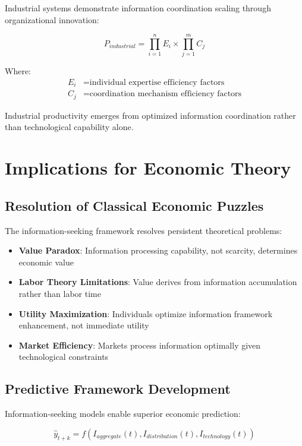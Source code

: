 \documentclass[12pt,a4paper]{article}
\begin{document}
Industrial systems demonstrate information coordination scaling through organizational innovation:

\begin{equation}
P_{industrial} = \prod_{i=1}^{n} E_i \times \prod_{j=1}^{m} C_j
\end{equation}

Where:
\begin{align}
E_i &= \text{individual expertise efficiency factors} \\
C_j &= \text{coordination mechanism efficiency factors}
\end{align}

Industrial productivity emerges from optimized information coordination rather than technological capability alone.

\section{Implications for Economic Theory}

\subsection{Resolution of Classical Economic Puzzles}

The information-seeking framework resolves persistent theoretical problems:

\begin{itemize}
\item \textbf{Value Paradox}: Information processing capability, not scarcity, determines economic value
\item \textbf{Labor Theory Limitations}: Value derives from information accumulation rather than labor time
\item \textbf{Utility Maximization}: Individuals optimize information framework enhancement, not immediate utility
\item \textbf{Market Efficiency}: Markets process information optimally given technological constraints
\end{itemize}

\subsection{Predictive Framework Development}

Information-seeking models enable superior economic prediction:

\begin{equation}
\hat{y}_{t+k} = f(I_{aggregate}(t), I_{distribution}(t), I_{technology}(t))
\end{equation}
\end{document}
